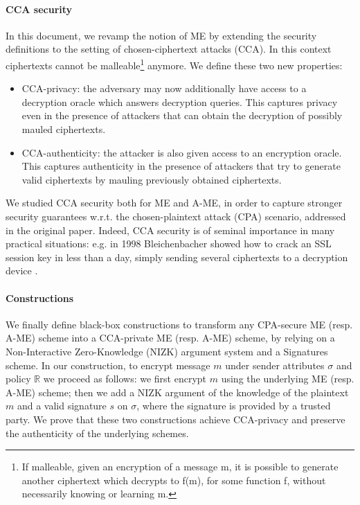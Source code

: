 \paragraph{CCA security}
In this document, we revamp the notion of ME by extending the security definitions to the setting of chosen-ciphertext attacks (CCA).
In this context ciphertexts cannot be malleable\footnote{If malleable, given an encryption of a message m, it is possible to generate another ciphertext which decrypts to f(m), for some function f, without necessarily knowing or learning m.} anymore. We define these two new properties:
\begin{itemize}
    \item CCA-privacy: the adversary may now additionally have access to a decryption oracle which answers decryption queries. This captures privacy even in the presence of attackers that can obtain the decryption of possibly mauled ciphertexts.
    \item CCA-authenticity: the attacker is also given access to an encryption oracle. This captures authenticity in the presence of attackers that try to generate valid ciphertexts by mauling previously obtained ciphertexts.
\end{itemize}
We studied CCA security both for ME and A-ME, in order to capture stronger security guarantees w.r.t. the chosen-plaintext attack (CPA) scenario, addressed in the original paper.
Indeed, CCA security is of seminal importance in many practical situations: e.g. in 1998 Bleichenbacher showed how to crack an SSL session key in less than a day, simply sending several ciphertexts to a decryption device \cite{Bleichenbacher}.

\paragraph{Constructions}
We finally define black-box constructions to transform any CPA-secure ME (resp. A-ME) scheme into a CCA-private ME (resp. A-ME) scheme, by relying on a Non-Interactive Zero-Knowledge (NIZK) argument system and a Signatures scheme.
\newline
In our construction, to encrypt message $m$ under sender attributes $\sigma$ and policy $\mathbb{R}$ we proceed as follows: we first encrypt $m$ using the underlying ME (resp. A-ME) scheme; then we add a NIZK argument of the knowledge of the plaintext $m$ and a valid signature $s$ on $\sigma$, where the signature is provided by a trusted party.
\newline
We prove that these two constructions achieve CCA-privacy and preserve the authenticity of the underlying schemes.
